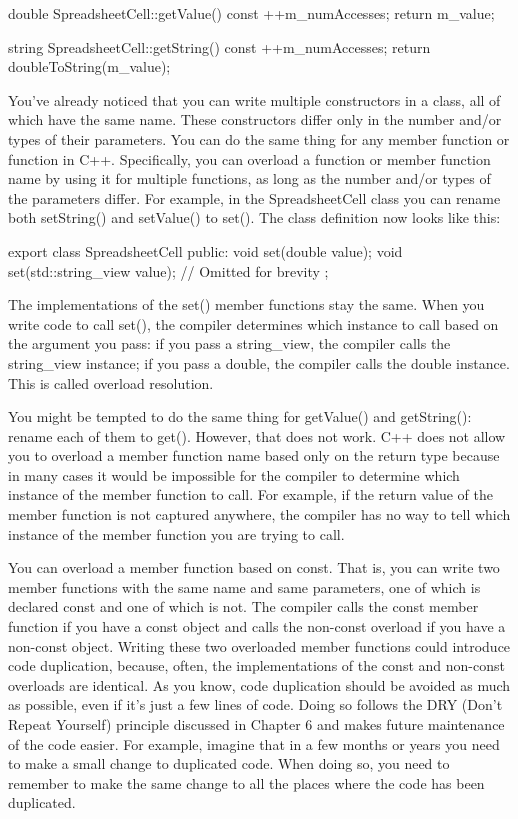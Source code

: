 \begin{cpp}
double SpreadsheetCell::getValue() const
{
    ++m_numAccesses;
    return m_value;
}

string SpreadsheetCell::getString() const
{
    ++m_numAccesses;
    return doubleToString(m_value);
}
\end{cpp}


You’ve already noticed that you can write multiple constructors in a class, all of which have the same name. These constructors differ only in the number and/or types of their parameters. You can do the same thing for any member function or function in C++. Specifically, you can overload a function or member function name by using it for multiple functions, as long as the number and/or types of the parameters differ. For example, in the SpreadsheetCell class you can rename both setString() and setValue() to set(). The class definition now looks like this:

\begin{cpp}
export class SpreadsheetCell
{
    public:
        void set(double value);
        void set(std::string_view value);
        // Omitted for brevity
};
\end{cpp}

The implementations of the set() member functions stay the same. When you write code to call set(), the compiler determines which instance to call based on the argument you pass: if you pass a string\_view, the compiler calls the string\_view instance; if you pass a double, the compiler calls the double instance. This is called overload resolution.

You might be tempted to do the same thing for getValue() and getString(): rename each of them to get(). However, that does not work. C++ does not allow you to overload a member function name based only on the return type because in many cases it would be impossible for the compiler to determine which instance of the member function to call. For example, if the return value of the member function is not captured anywhere, the compiler has no way to tell which instance of the member function you are trying to call.


You can overload a member function based on const. That is, you can write two member functions with the same name and same parameters, one of which is declared const and one of which is not. The compiler calls the const member function if you have a const object and calls the non-const overload if you have a non-const object. Writing these two overloaded member functions could introduce code duplication, because, often, the implementations of the const and non-const overloads are identical. As you know, code duplication should be avoided as much as possible, even if it’s just a few lines of code. Doing so follows the DRY (Don’t Repeat Yourself) principle discussed in Chapter 6 and makes future maintenance of the code easier. For example, imagine that in a few months or years you need to make a small change to duplicated code. When doing so, you need to remember to make the same change to all the places where the code has been duplicated.

